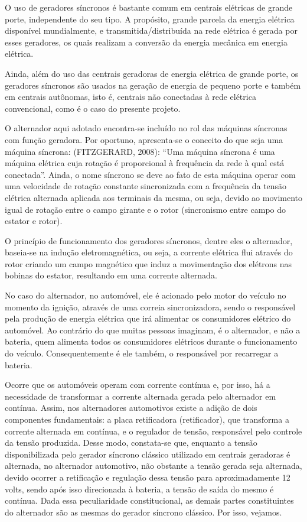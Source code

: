 O uso de geradores síncronos é bastante comum em centrais elétricas de grande porte, independente do seu tipo. A propósito, grande parcela da energia elétrica disponível mundialmente, e transmitida/distribuída na rede elétrica é gerada por esses geradores, os quais realizam a conversão da energia mecânica em energia elétrica. 

Ainda, além do uso das centrais geradoras de energia elétrica de grande porte, os geradores síncronos são usados na geração de energia de pequeno porte e também em centrais autônomas, isto é, centrais não conectadas à rede elétrica convencional, como é o caso do presente projeto.

O alternador aqui adotado encontra-se incluído no rol das máquinas síncronas com função geradora. Por oportuno, apresenta-se o conceito do que seja uma máquina síncrona: (FITZGERARD, 2008): “Uma máquina síncrona é uma máquina elétrica cuja rotação é proporcional à frequência da rede à qual está conectada”. Ainda, o nome síncrono se deve ao fato de esta máquina operar com uma velocidade de rotação constante sincronizada com a frequência da tensão elétrica alternada aplicada aos terminais da mesma, ou seja, devido ao movimento igual de rotação entre o campo girante e o rotor (sincronismo entre campo do estator e rotor).

O princípio de funcionamento dos geradores síncronos, dentre eles o alternador, baseia-se na indução eletromagnética, ou seja, a corrente elétrica flui através do rotor criando um campo magnético que induz a movimentação dos elétrons nas bobinas do estator, resultando em uma corrente alternada.

No caso do alternador, no automóvel, ele é acionado pelo motor do veículo no momento da ignição, através de uma correia sincronizadora, sendo o responsável pela produção de energia elétrica que irá alimentar os consumidores elétrico do automóvel. Ao contrário do que muitas pessoas imaginam, é o alternador, e não a bateria, quem alimenta todos os consumidores elétricos durante o funcionamento do veículo. Consequentemente é ele também, o responsável por recarregar a bateria.

 Ocorre que os automóveis operam com corrente contínua e, por isso, há a necessidade de transformar a corrente alternada gerada pelo alternador em contínua. Assim, nos alternadores automotivos existe a adição de dois componentes fundamentais: a placa retificadora (retificador), que transforma a corrente alternada em contínua, e o regulador de tensão, responsável pelo controle da tensão produzida.
Desse modo, constata-se que, enquanto a tensão disponibilizada pelo gerador síncrono clássico utilizado em centrais geradoras é alternada, no alternador automotivo, não obstante a tensão gerada seja alternada, devido ocorrer a retificação e regulação dessa tensão para aproximadamente 12 volts, sendo após isso direcionada à bateria, a tensão de saída do mesmo é contínua. Dada essa peculiaridade constitucional, as demais partes constituintes do alternador são as mesmas do gerador síncrono clássico. Por isso, vejamos. 

